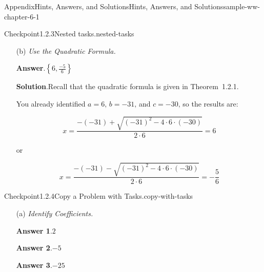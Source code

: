 \documentclass[oneside,10pt,]{book}
\newcommand{\blocktitlefont}{\relax}
\newcommand{\lititle}[1]{{\slshape#1}}
\numberwithin{equation}{section}
\begin{document}
\begin{solutions-chapter}{Appendix}{Hints, Answers, and Solutions}{}{Hints, Answers, and Solutions}{}{}{sample-ww-chapter-6-1}
\begin{inlinesolution}{Checkpoint}{1.2.3}{Nested tasks.}{nested-tasks}
\begin{enumerate}[font=\bfseries,label=(\alph*),ref=\alph*]
\begin{enumerate}[font=\bfseries,label=(\roman*),ref=\theenumi.\roman*]
\item[(iii)]\noindent\textbf{\blocktitlefont Answer}.\hypertarget{nested-tasks-3-5-2-back}{}\quad{}\(-30\)%
\par\smallskip%
\noindent\textbf{\blocktitlefont Solution}.\hypertarget{nested-tasks-3-5-3-back}{}\quad{}Take the constant term for the value of \(c\text{.}\) \emph{In this case}, \(c = {-30}\text{.}\)%
\end{enumerate}%
\item[(b)]\lititle{Use the Quadratic Formula.}\par%
\par\smallskip%
\noindent\textbf{\blocktitlefont Answer}.\hypertarget{nested-tasks-4-3-back}{}\quad{}\(\left\{6,\frac{-5}{6}\right\}\)%
\par\smallskip%
\noindent\textbf{\blocktitlefont Solution}.\hypertarget{nested-tasks-4-4-back}{}\quad{}Recall that the quadratic formula is given in Theorem~1.2.1.%
\par
You already identified \(a = {6}\text{,}\) \(b = {-31}\text{,}\) and \(c = {-30}\text{,}\) so the results are:%
\par
%
\begin{equation*}
x = {\frac{-\left(-31\right)+\sqrt{\left(-31\right)^{2}-4\cdot 6\cdot \left(-30\right)}}{2\cdot 6}} = {6}
\end{equation*}
%
\par
or%
\par
%
\begin{equation*}
x = {\frac{-\left(-31\right)-\sqrt{\left(-31\right)^{2}-4\cdot 6\cdot \left(-30\right)}}{2\cdot 6}} = {-{\frac{5}{6}}}
\end{equation*}
%
\end{enumerate}%
\end{inlinesolution}%
\begin{inlinesolution}{Checkpoint}{1.2.4}{Copy a Problem with Tasks.}{copy-with-tasks}%
\begin{enumerate}[font=\bfseries,label=(\alph*),ref=\alph*]%
\item[(a)]\lititle{Identify Coefficients.}\par%
\par\smallskip%
\noindent\textbf{\blocktitlefont Answer 1}.\hypertarget{copy-with-tasks-3-3-back}{}\quad{}\(2\)%
\par\smallskip%
\noindent\textbf{\blocktitlefont Answer 2}.\hypertarget{copy-with-tasks-3-4-back}{}\quad{}\(-5\)%
\par\smallskip%
\noindent\textbf{\blocktitlefont Answer 3}.\hypertarget{copy-with-tasks-3-5-back}{}\quad{}\(-25\)%

\end{enumerate}
\end{inlinesolution}
\end{solutions-chapter}
\end{document}
